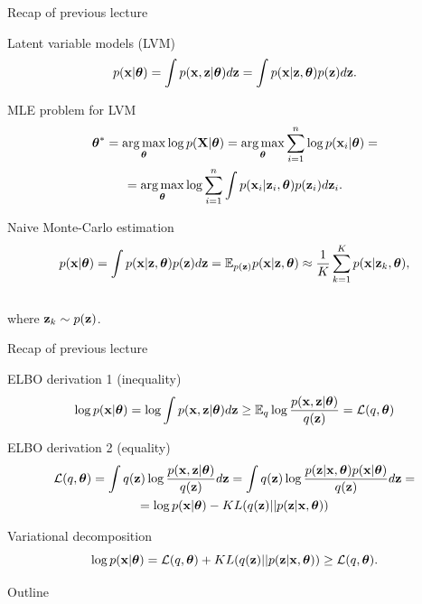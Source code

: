 	\begin{frame}{Recap of previous lecture}
		\begin{block}{Latent variable models (LVM)}
			\vspace{-0.3cm}
			\[
			p(\mathbf{x} | \boldsymbol{\theta}) = \int p(\mathbf{x}, \mathbf{z} | \boldsymbol{\theta}) d\mathbf{z} = \int p(\mathbf{x} | \mathbf{z}, \boldsymbol{\theta}) p(\mathbf{z}) d\mathbf{z}.
			\]
		\end{block}
		\begin{block}{MLE problem for LVM}
			\vspace{-0.7cm}
			\begin{multline*}
				\boldsymbol{\theta}^* = \operatorname*{arg\,max}_{\boldsymbol{\theta}} \log p(\mathbf{X}| \boldsymbol{\theta}) = \operatorname*{arg\,max}_{\boldsymbol{\theta}} \sum_{i=1}^n \log p(\mathbf{x}_i | \boldsymbol{\theta}) = \\ = \operatorname*{arg\,max}_{\boldsymbol{\theta}} \log \sum_{i=1}^n \int p(\mathbf{x}_i| \mathbf{z}_i, \boldsymbol{\theta}) p(\mathbf{z}_i) d\mathbf{z}_i.
			\end{multline*}
			\vspace{-0.7cm}
		\end{block}
		\begin{block}{Naive Monte-Carlo estimation}
			\vspace{-0.7cm}
			\[
			p(\mathbf{x} | \boldsymbol{\theta}) = \int p(\mathbf{x} | \mathbf{z}, \boldsymbol{\theta}) p(\mathbf{z}) d\mathbf{z} = \mathbb{E}_{p(\mathbf{z})} p(\mathbf{x} | \mathbf{z}, \boldsymbol{\theta}) \approx \frac{1}{K} \sum_{k=1}^{K} p(\mathbf{x} | \mathbf{z}_k, \boldsymbol{\theta}),
			\]
			\vspace{-0.5cm} \\
			where $\mathbf{z}_k \sim p(\mathbf{z})$. 
		\end{block}
	\end{frame}
	\begin{frame}{Recap of previous lecture}
		\begin{block}{ELBO derivation 1 (inequality)}
			\vspace{-0.3cm}
			\begin{multline*}
				\log p(\mathbf{x}| \boldsymbol{\theta}) 
				= \log \int p(\mathbf{x}, \mathbf{z} | \boldsymbol{\theta}) d\mathbf{z} \geq \mathbb{E}_{q} \log \frac{p(\mathbf{x}, \mathbf{z}| \boldsymbol{\theta})}{q(\mathbf{z})} =  \mathcal{L}(q, \boldsymbol{\theta})
			\end{multline*}
			\vspace{-0.3cm}
		\end{block}
		\begin{block}{ELBO derivation 2 (equality)}
			\vspace{-0.3cm}
			\begin{multline*}
				\mathcal{L} (q, \boldsymbol{\theta}) = \int q(\mathbf{z}) \log \frac{p(\mathbf{x}, \mathbf{z} | \boldsymbol{\theta})}{q(\mathbf{z})}d\mathbf{z} = 
				\int q(\mathbf{z}) \log \frac{p(\mathbf{z}|\mathbf{x}, \boldsymbol{\theta})p(\mathbf{x}| \boldsymbol{\theta})}{q(\mathbf{z})}d\mathbf{z} = \\
				= \log p(\mathbf{x}| \boldsymbol{\theta}) - KL(q(\mathbf{z}) || p(\mathbf{z}|\mathbf{x}, \boldsymbol{\theta}))
			\end{multline*}
		\end{block}
		\vspace{-0.3cm}
		\begin{block}{Variational decomposition}
			\[
			\log p(\mathbf{x}| \boldsymbol{\theta}) = \mathcal{L} (q, \boldsymbol{\theta}) + KL(q(\mathbf{z}) || p(\mathbf{z}|\mathbf{x}, \boldsymbol{\theta})) \geq \mathcal{L} (q, \boldsymbol{\theta}).
			\]
		\end{block}
	\end{frame}
	\begin{frame}{Outline}
		\tableofcontents
	\end{frame}
